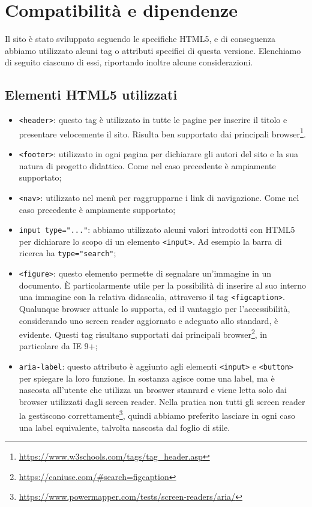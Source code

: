 \documentclass[12pt]{article}
\newcommand{\code}[1]{\texttt{#1}}
\begin{document}
	\section{Compatibilità e dipendenze}
	Il sito è stato sviluppato seguendo le specifiche HTML5, e di conseguenza abbiamo utilizzato alcuni tag o attributi specifici di questa versione. Elenchiamo di seguito ciascuno di essi, riportando inoltre alcune considerazioni.
	\subsection{Elementi HTML5 utilizzati}
	\begin{itemize}
		\item \code{<header>}: questo tag è utilizzato in tutte le pagine per inserire il titolo e presentare velocemente il sito. Risulta ben supportato dai principali browser\footnote{\url{https://www.w3schools.com/tags/tag_header.asp}}.
		\item \code{<footer>}: utilizzato in ogni pagina per dichiarare gli autori del sito e la sua natura di progetto didattico. Come nel caso precedente è ampiamente supportato;
		\item \code{<nav>}: utilizzato nel menù per raggrupparne i link di navigazione. Come nel caso precedente è ampiamente supportato;
		\item \code{input type="..."}: abbiamo utilizzato alcuni valori introdotti con HTML5 per dichiarare lo scopo di un elemento \code{<input>}. Ad esempio la barra di ricerca ha \code{type="search"};
		\item \code{<figure>}: questo elemento permette di segnalare un'immagine in un documento. È particolarmente utile per la possibilità di inserire al suo interno una immagine con la relativa didascalia, attraverso il tag \code{<figcaption>}. Qualunque browser attuale lo supporta, ed il vantaggio per l'accessibilità, considerando uno screen reader aggiornato e adeguato allo standard, è evidente. Questi tag risultano supportati dai principali browser\footnote{\url{https://caniuse.com/\#search=figcaption}}, in particolare da IE 9+;
		\item \code{aria-label}: questo attributo è aggiunto agli elementi \code{<input>} e \code{<button>} per spiegare la loro funzione. In sostanza agisce come una label, ma è nascosta all'utente che utilizza un broswer stanrard e viene letta solo dai browser utilizzati dagli screen reader. Nella pratica non tutti gli screen reader la gestiscono correttamente\footnote{\url{https://www.powermapper.com/tests/screen-readers/aria/}}, quindi abbiamo preferito lasciare in ogni caso una label equivalente, talvolta nascosta dal foglio di stile.
	\end{itemize}
	
\end{document}
